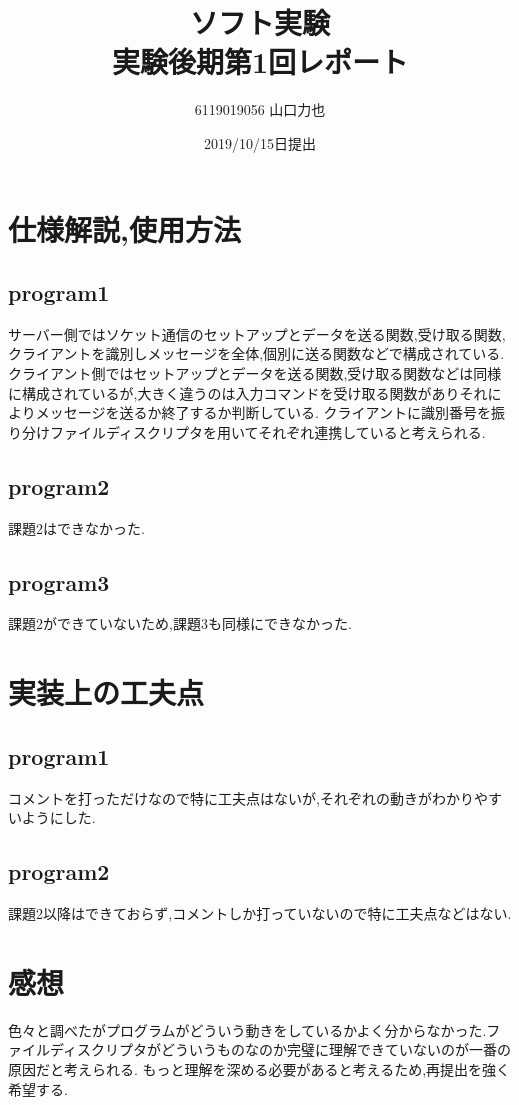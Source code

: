 \documentclass{jarticle}
\title{{ソフト実験}\\実験後期第1回レポート}
\author{6119019056 山口力也}
\date{2019/10/15日提出}
\begin{document}
\maketitle
\section{仕様解説,使用方法}
\subsection{program1}
サーバー側ではソケット通信のセットアップとデータを送る関数,受け取る関数,クライアントを識別しメッセージを全体,個別に送る関数などで構成されている. \\
クライアント側ではセットアップとデータを送る関数,受け取る関数などは同様に構成されているが,大きく違うのは入力コマンドを受け取る関数がありそれによりメッセージを送るか終了するか判断している.
クライアントに識別番号を振り分けファイルディスクリプタを用いてそれぞれ連携していると考えられる.
\subsection{program2}
課題2はできなかった.
\subsection{program3}
課題2ができていないため,課題3も同様にできなかった.
\section{実装上の工夫点}
\subsection{program1}
コメントを打っただけなので特に工夫点はないが,それぞれの動きがわかりやすいようにした.
\subsection{program2}
課題2以降はできておらず,コメントしか打っていないので特に工夫点などはない.
\section{感想}
色々と調べたがプログラムがどういう動きをしているかよく分からなかった.ファイルディスクリプタがどういうものなのか完璧に理解できていないのが一番の原因だと考えられる.
もっと理解を深める必要があると考えるため,再提出を強く希望する.
\end{document}
